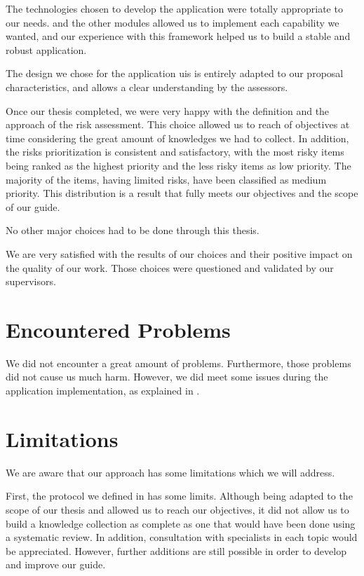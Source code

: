 The technologies chosen to develop the application were totally appropriate to our needs.  and the other modules allowed us to implement each capability we wanted, and our experience with this \gls{framework} helped us to build a stable and robust application.

The design we chose for the application \glspl{ui} is entirely adapted to our proposal characteristics, and allows a clear understanding by the assessors.

Once our thesis completed, we were very happy with the definition and the approach of the risk assessment. This choice allowed us to reach of objectives at time considering the great amount of knowledges we had to collect. In addition, the risks prioritization is consistent and satisfactory, with the most risky items being ranked as the highest priority and the less risky items as low priority. The majority of the items, having limited risks, have been classified as medium priority. This distribution is a result that fully meets our objectives and the scope of our guide.

No other major choices had to be done through this thesis.

We are very satisfied with the results of our choices and their positive impact on the quality of our work. Those choices were questioned and validated by our supervisors.

\section{Encountered Problems}
\label{sec:conclusions_difficulties}

We did not encounter a great amount of problems. Furthermore, those problems did not cause us much harm. However, we did meet some issues during the application implementation, as explained in .

\section{Limitations}
\label{sec:conclusions_limitations}

We are aware that our approach has some limitations which we will address.

First, the protocol we defined in  has some limits. Although being adapted to the scope of our thesis and allowed us to reach our objectives, it did not allow us to build a knowledge collection as complete as one that would have been done using a systematic review. In addition, consultation with specialists in each topic would be appreciated. However, further additions are still possible in order to develop and improve our guide.

